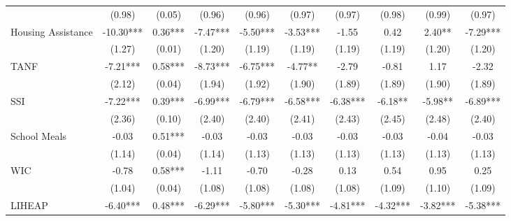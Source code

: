 \begin{table}[]
\begin{tabular*}{1.36\textwidth}{@{\extracolsep{\fill}}lccccccccc}
                   & (0.98)        & (0.05)        & (0.96)        & (0.96)        & (0.97)        & (0.97)        & (0.98)        & (0.99)        & (0.97)     \\
\addlinespace
Housing Assistance & -10.30***          & 0.36***          & -7.47***          & -5.50***          & -3.53***          & -1.55          & 0.42          & 2.40**          & -7.29*** \\
                   & (1.27)              & (0.01)              & (1.20)              & (1.19)              & (1.19)              & (1.19)              & (1.19)              & (1.20)              & (1.20)     \\
\addlinespace
TANF               & -7.21***        & 0.58***        & -8.73***        & -6.75***        & -4.77**        & -2.79        & -0.81        & 1.17        & -2.32 \\
                   & (2.12)            & (0.04)            & (1.94)            & (1.92)            & (1.90)            & (1.89)            & (1.89)            & (1.90)            & (1.89)     \\
\addlinespace
SSI                & -7.22***         & 0.39***         & -6.99***         & -6.79***         & -6.58***         & -6.38***         & -6.18**         & -5.98**         & -6.89*** \\
                   & (2.36)             & (0.10)             & (2.40)             & (2.40)             & (2.41)             & (2.43)             & (2.45)             & (2.48)             & (2.40)     \\
\addlinespace
School Meals       & -0.03 & 0.51*** & -0.03 & -0.03 & -0.03 & -0.03 & -0.03 & -0.04 & -0.03 \\
                   & (1.14)     & (0.04)     & (1.14)     & (1.13)     & (1.13)     & (1.13)     & (1.13)     & (1.13)     & (1.13)     \\
\addlinespace
WIC                & -0.78         & 0.58***         & -1.11         & -0.70         & -0.28         & 0.13         & 0.54         & 0.95         & 0.25 \\
                   & (1.04)             & (0.04)             & (1.08)             & (1.08)             & (1.08)             & (1.08)             & (1.09)             & (1.10)             & (1.09)     \\
\addlinespace
LIHEAP             & -6.40***      & 0.48***      & -6.29***      & -5.80***      & -5.30***      & -4.81***      & -4.32***      & -3.82***      & -5.38*** \\

\end{tabular*}
\end{table}
